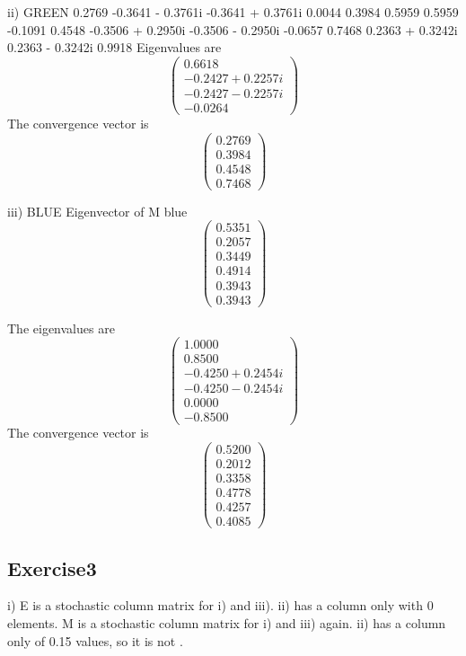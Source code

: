 \documentclass{article} %
\begin{document}
ii) GREEN
   0.2769            -0.3641 - 0.3761i  -0.3641 + 0.3761i   0.0044          
   0.3984             0.5959             0.5959            -0.1091          
   0.4548            -0.3506 + 0.2950i  -0.3506 - 0.2950i  -0.0657          
   0.7468             0.2363 + 0.3242i   0.2363 - 0.3242i   0.9918          
Eigenvalues are 
   \[ \left( \begin{array}{c}   
   0.6618          \\
  -0.2427 + 0.2257i \\
  -0.2427 - 0.2257i \\
  -0.0264     \end{array} \right)\]       
The convergence vector is
   \[ \left( \begin{array}{c}   
    0.2769 \\
    0.3984 \\
    0.4548 \\
    0.7468   \end{array} \right)\]    
    
    
 iii)
BLUE
Eigenvector of M blue
   \[ \left( \begin{array}{c}  
   0.5351        \\
   0.2057           \\
   0.3449             \\       
   0.4914          \\
   0.3943          \\   
   0.3943      \end{array} \right)\] 

The eigenvalues are
   \[ \left( \begin{array}{c}  
   1.0000          \\
   0.8500          \\
  -0.4250 + 0.2454i\\
  -0.4250 - 0.2454i\\
   0.0000          \\
  -0.8500          \end{array} \right)\]    
The convergence vector is
   \[ \left( \begin{array}{c}   
    0.5200\\
    0.2012\\
    0.3358\\
    0.4778\\
    0.4257\\
    0.4085\end{array} \right)\]    
\subsection{Exercise3}
i)
E is a stochastic column matrix for i) and iii). ii) has a column only with 0 elements.
M is a stochastic column matrix for i) and iii) again. ii) has a column only of 0.15 values, so it is not .
\end{document}
